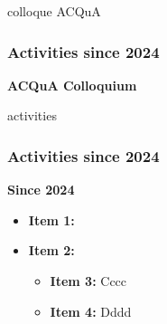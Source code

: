\documentclass[t,aspectratio=169,xcolor=dvipsnames]{beamer}
\begin{document}



\begin{frame}{colloque ACQuA}

    \frametitle{Activities since 2024} 

    \begin{alertblock}{\textbf{ACQuA Colloquium}}
       
        

    \end{alertblock}

\end{frame}

\begin{frame}{activities}

    \frametitle{Activities since 2024} 

    \begin{alertblock}{\textbf{Since 2024}}
       
        \begin{itemize}
            \item \textbf{Item 1:}
            \item \textbf{Item 2:}
            \begin{itemize}
                \item \textbf{Item 3:} Cccc 
                \item \textbf{Item 4:} Dddd 
            \end{itemize}
        \end{itemize}

    \end{alertblock}

\end{frame}
\end{document}
